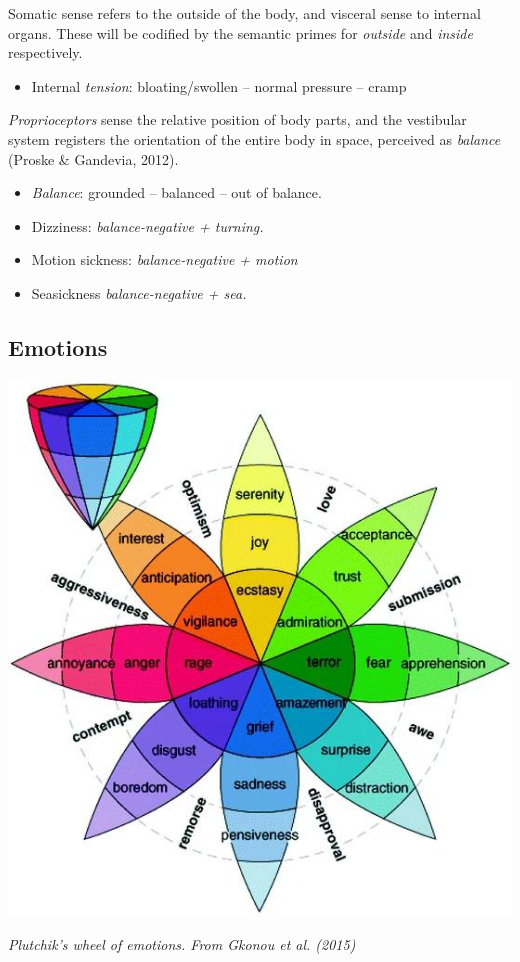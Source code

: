 Somatic sense refers to the outside of the body, and visceral sense to internal organs. These will be codified by the semantic primes for \textit{outside} and \textit{inside} respectively.   

\begin{itemize}
	\item Internal \textit{tension}: bloating/swollen – normal pressure – cramp  
\end{itemize}

{\it Proprioceptors} sense the relative position of body parts, and the vestibular system registers the orientation of the entire body in space, perceived as \textit{balance} (Proske \& Gandevia, 2012).  

\begin{itemize}
	\item \textit{Balance}: grounded – balanced – out of balance.  

	\item Dizziness: \textit{balance-negative + turning.} 

	\item Motion sickness:  \textit{ balance-negative + motion } 

	\item Seasickness \textit{balance-negative + sea.} 
\end{itemize}


\subsection{Emotions}

\begin{cent\idx{scent}er}
	\includegraphics[scale=0.45]{./Images/emotions.jpg}

	{\it \footnotesize Plutchik's wheel of emotions. From Gkonou et al. (2015)}
\end{cent\idx{scent}er}

